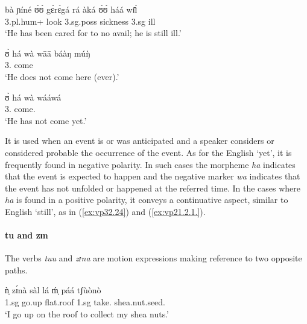 \begin{exe}
\begin{exe}
\begin{exe}
{\begin{exe}
\begin{exe}
\begin{exe}
\begin{exe}
\begin{exe}
\begin{exe}
\begin{exe}
\begin{xlist}
\begin{exe}
\begin{exe}
\begin{exe}
\begin{exe}
\begin{exe}
\begin{exe}
\begin{exe}
\begin{exe}
\begin{exe}
\begin{exe}
\begin{exe}
\begin{exe}
\begin{exe}
\begin{exe}
\begin{exe}
\ex\label{ex:vp21.2.1.}
\gll bà ɲíné ʊ̀ʊ̀ gɛ̀rɛ̀gá rá àká ʊ̀ʊ̀ háá wɪ̄ɪ̀ \\
 {\sc 3.pl.hum+} look {\sc 3.sg.poss} sickness {\foc} {\conn}  {\sc 3.sg}
{\mod} ill \\
\glt  `He has been cared for to no avail; he is still ill.' 


\ex\label{ex:vp20.1.1.}
\gll ʊ̀ há  wà wāā báàŋ múŋ̀ \\
       {3.\sg} {\mod}  {\neg} come {\dem} {\quant}\\
\glt  `He does not come here (ever).' 


\ex\label{ex:vp20.3.1.}
\gll ʊ̀ há wà wááwá \\
       {3.\sg} {\mod}   {\neg} come.{\pfv} \\
\glt  `He has not come yet.' 

% 

\z 
 \z
 
 It is used when an event is or was anticipated and a speaker considers or 
considered probable the occurrence of the event. As  for the English `yet', it 
is frequently found in negative polarity. In such cases the morpheme {\it ha} 
indicates that the event is expected to happen and the negative marker {\it wa} 
indicates that the event has not unfolded or happened at the referred time. In 
the cases where {\it ha} is found in a positive polarity,  it  conveys a 
continuative aspect, similar to English `still',  as in (\ref{ex:vp32.24}) and 
(\ref{ex:vp21.2.1.}). 



\paragraph{tu and zɪn}
\label{sec:GRM-preverb-up-down} 

The verbs {\it tuu} and {\it zɪna} are motion
expressions making reference to two opposite paths. 


\ea\label{ex:GRM-verb-up-down}
\ea
\gll ǹ̩ zɪ́nà sàl lá ḿ̩ páá tʃùònò\\
{\sc 1.sg} go.up flat.roof {\foc} {\sc 1.sg} take.{\pv} shea.nut.seed.{\pl}\\
\glt  `I go up on the roof to collect my shea nuts.'


\end{exe}
\end{exe}
\end{exe}
\end{exe}
\end{exe}
\end{exe}
\end{exe}
\end{exe}
\end{exe}
\end{exe}
\end{exe}
\end{exe}
\end{exe}
\end{exe}
\end{exe}
\end{xlist}
\end{exe}
\end{exe}
\end{exe}
\end{exe}
\end{exe}
\end{exe}
\end{exe}}
\end{exe}
\end{exe}
\end{exe}
